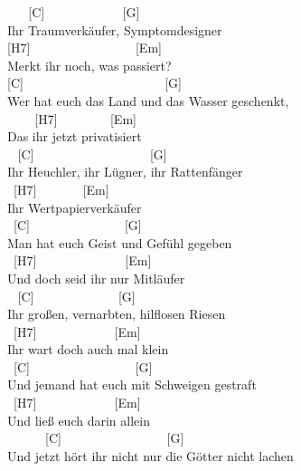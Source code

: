 \documentclass[
  letterpaper,
  twoside=false]{scrbook}
\begin{document}
~ ~ {[}C{]} ~ ~ ~ ~ ~ ~ ~ {[}G{]}\\
Ihr Traumverkäufer, Symptomdesigner\\
{[}H7{]} ~ ~ ~ ~ ~ ~ ~ ~ ~ ~{[}Em{]}\\
Merkt ihr noch, was passiert?\\
{[}C{]} ~ ~ ~ ~ ~ ~ ~ ~ ~ ~ ~ ~ ~ {[}G{]}\\
Wer hat euch das Land und das Wasser geschenkt,\\
\hspace*{0.333em} ~ ~ ~{[}H7{]} ~ ~ ~ ~ ~{[}Em{]}\\
Das ihr jetzt privatisiert\\
\hspace*{0.333em} ~ {[}C{]} ~ ~ ~ ~ ~ ~ ~ ~ ~ ~ ~{[}G{]}\\
Ihr Heuchler, ihr Lügner, ihr Rattenfänger\\
\hspace*{0.333em} ~{[}H7{]} ~ ~ ~ ~ {[}Em{]}\\
Ihr Wertpapierverkäufer\\
\hspace*{0.333em} ~{[}C{]} ~ ~ ~ ~ ~ ~ ~ ~ ~{[}G{]}\\
Man hat euch Geist und Gefühl gegeben\\
\hspace*{0.333em} ~{[}H7{]} ~ ~ ~ ~ ~ ~ ~ ~ {[}Em{]}\\
Und doch seid ihr nur Mitläufer\\
\hspace*{0.333em} ~ {[}C{]} ~ ~ ~ ~ ~ ~ ~ ~{[}G{]}\\
Ihr großen, vernarbten, hilflosen Riesen\\
\hspace*{0.333em} ~{[}H7{]} ~ ~ ~ ~ ~ ~ ~ {[}Em{]}\\
Ihr wart doch auch mal klein\\
\hspace*{0.333em} ~{[}C{]} ~ ~ ~ ~ ~ ~ ~ ~ ~ ~{[}G{]}\\
Und jemand hat euch mit Schweigen gestraft\\
\hspace*{0.333em} ~{[}H7{]} ~ ~ ~ ~ ~ ~ ~ {[}Em{]}\\
Und ließ euch darin allein\\
\hspace*{0.333em} ~ ~ ~ ~{[}C{]} ~ ~ ~ ~ ~ ~ ~ ~ ~ ~{[}G{]}\\
Und jetzt hört ihr nicht nur die Götter nicht lachen\\
\end{document}
